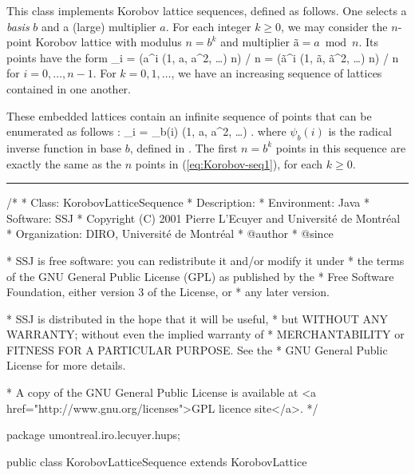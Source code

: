 

This class implements Korobov lattice sequences, defined as follows.
One selects a \emph{basis} $b$ and a (large) multiplier $a$.
For each integer $k\ge 0$, we may consider the
$n$-point Korobov lattice with modulus $n = b^k$ and multiplier
$\mbox{\~a} = a \bmod n$.
Its points have the form
\eq
 _i = (a^i (1, a, a^2, \ldots) \bmod n) / n
       = (\mbox{\~a}^i (1, \mbox{\~a}, \mbox{\~a}^2, \ldots) \bmod n) / n
\endeq
for $i=0,\dots,n-1$.
For $k = 0,1,\dots$, we have an increasing sequence of lattices
contained in one another.

These embedded lattices contain an infinite sequence of points that 
can be enumerated as follows \cite{vHIC01a}:
\eq
 _i = \psi_b(i) \left(1, a, a^2, \ldots \right) .
\endeq
where $\psi_b(i)$ is the radical inverse function in base $b$,
defined in .
The first $n=b^k$ points in this sequence are exactly the same as
the $n$ points in (\ref{eq:Korobov-seq1}), for each $k\ge 0$.

\bigskip\hrule\bigskip

\begin{code}

\begin{hide}
/*
 * Class:        KorobovLatticeSequence
 * Description:  
 * Environment:  Java
 * Software:     SSJ 
 * Copyright (C) 2001  Pierre L'Ecuyer and Université de Montréal
 * Organization: DIRO, Université de Montréal
 * @author       
 * @since

 * SSJ is free software: you can redistribute it and/or modify it under
 * the terms of the GNU General Public License (GPL) as published by the
 * Free Software Foundation, either version 3 of the License, or
 * any later version.

 * SSJ is distributed in the hope that it will be useful,
 * but WITHOUT ANY WARRANTY; without even the implied warranty of
 * MERCHANTABILITY or FITNESS FOR A PARTICULAR PURPOSE.  See the
 * GNU General Public License for more details.

 * A copy of the GNU General Public License is available at
   <a href="http://www.gnu.org/licenses">GPL licence site</a>.
 */
\end{hide}
package umontreal.iro.lecuyer.hups;


public class KorobovLatticeSequence extends KorobovLattice \begin{hide} { 
   int base;         // Base for radical inversion
   int inverse;      // global variables for radical inverssion,
   int n;            // since bloody JAVA cannot pass references

   // Method modPower is inherited from Rank1Lattice.
\end{hide}
\end{code}

